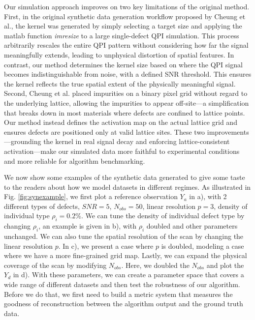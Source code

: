 Our simulation approach improves on two key limitations of the original method. First, in the original synthetic data generation workflow proposed by Cheung et al., the kernel was generated by simply selecting a target size and applying the matlab function \textit{imresize} to a large single-defect QPI simulation. This process arbitrarily rescales the entire QPI pattern without considering how far the signal meaningfully extends, leading to unphysical distortion of spatial features. In contrast, our method determines the kernel size based on where the QPI signal becomes indistinguishable from noise, with a defined SNR threshold. This ensures the kernel reflects the true spatial extent of the physically meaningful signal. Second, Cheung et al. placed impurities on a binary pixel grid without regard to the underlying lattice, allowing the impurities to appear off-site—a simplification that breaks down in most materials where defects are confined to lattice points. Our method instead defines the activation map on the actual lattice grid and ensures defects are positioned only at valid lattice sites. These two improvements—grounding the kernel in real signal decay and enforcing lattice-consistent activation—make our simulated data more faithful to experimental conditions and more reliable for algorithm benchmarking.

We now show some examples of the synthetic data generated to give some taste to the readers about how we model datasets in different regimes. As illustrated in Fig. \ref{fig:synexample}, we first plot a reference observation $Y_a$ in a), with 2 different types of defects, $SNR = 5$, $N_{obs}=50$, linear resolution $p = 3$, density of individual type $\rho_i = 0.2 \%$. We can tune the density of individual defect type by changing $\rho_i$, an example is given in b), with $\rho_i$ doubled and other parameters unchanged. We can also tune the spatial resolution of the scan by changing the linear resolution $p$. In c), we present a case where $p$ is doubled, modeling a case where we have a more fine-grained grid map. Lastly, we can expand the physical coverage of the scan by modifying $N_{obs}$. Here, we doubled the $N_{obs}$ and plot the $Y_d$ in d). With these parameters, we can create a parameter space that covers a wide range of different datasets and then test the robustness of our algorithm. Before we do that, we first need to build a metric system that measures the goodness of reconstruction between the algorithm output and the ground truth data. 

